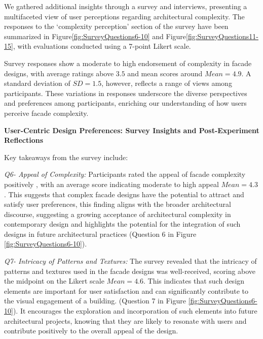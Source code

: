 

We gathered additional insights through a survey and interviews, presenting a multifaceted view of user perceptions regarding architectural complexity.
The responses to the `complexity perception' section of the survey have been summarized in Figure\ref{fig:SurveyQuestions6-10} and Figure\ref{fig:SurveyQuestions11-15}, with evaluations conducted using a 7-point Likert scale.


Survey responses show a moderate to high endorsement of complexity in facade designs, with average ratings above \(3.5\) and mean scores around \(Mean = 4.9\).
A standard deviation of \(SD = 1.5\), however, reflects a range of views among participants.
These variations in responses underscore the diverse perspectives and preferences among participants, enriching our understanding of how users perceive facade complexity.

\textbf{User-Centric Design Preferences: Survey Insights and Post-Experiment Reflections}

Key takeaways from the survey include:


\textit{Q6- Appeal of Complexity:}
Participants rated the appeal of facade complexity positively , with an average score indicating moderate to high appeal \(Mean=4.3\).
This suggests that complex facade designs have the potential to attract and satisfy user preferences, this finding aligns with the broader architectural discourse, suggesting a growing acceptance of architectural complexity in contemporary design and highlights the potential for the integration of such designs in future architectural practices (Question 6 in Figure \ref{fig:SurveyQuestions6-10}).

\textit{Q7-  Intricacy of Patterns and Textures:}
The survey revealed that the intricacy of patterns and textures used in the facade designs was well-received, scoring above the midpoint on the Likert scale \(Mean=4.6\).
This indicates that such design elements are important for user satisfaction and can significantly contribute to the visual engagement of a building.
(Question 7 in Figure \ref{fig:SurveyQuestions6-10}).
It encourages the exploration and incorporation of such elements into future architectural projects, knowing that they are likely to resonate with users and contribute positively to the overall appeal of the design.

